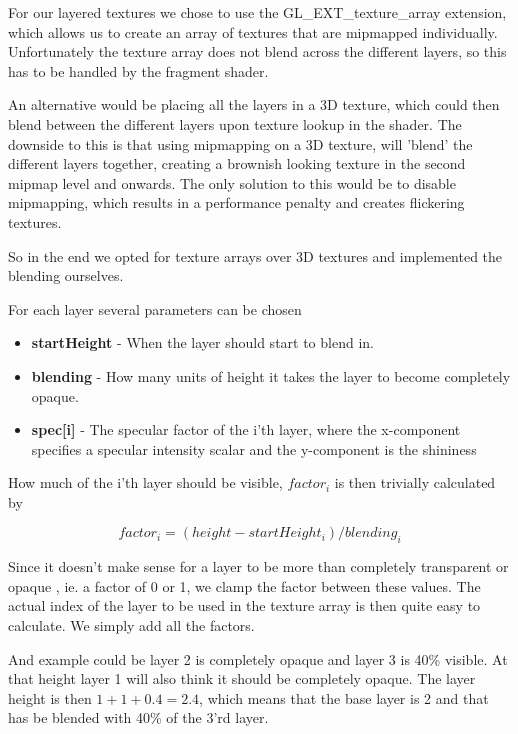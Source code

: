 For our layered textures we chose to use the GL\_EXT\_texture\_array
extension, which allows us to create an array of textures that are
mipmapped individually. Unfortunately the texture array does not blend
across the different layers, so this has to be handled by the fragment
shader.


An alternative would be placing all the layers in a 3D texture, which
could then blend between the different layers upon texture lookup in
the shader. The downside to this is that using mipmapping on a 3D
texture, will 'blend' the different layers together, creating a
brownish looking texture in the second mipmap level and onwards. The
only solution to this would be to disable mipmapping, which results in
a performance penalty and creates flickering textures.

So in the end we opted for texture arrays over 3D textures and
implemented the blending ourselves.

For each layer several parameters can be chosen

\newcommand{\layerProp}[2]{\item \textbf{#1} - #2}
\begin{itemize}
  \layerProp{startHeight}{When the layer should start to blend in.}
  \layerProp{blending}{How many units of height it takes the layer to
    become completely opaque.}
  \layerProp{spec[i]}{The specular factor of the i'th layer, where the
    x-component specifies a specular intensity scalar and the
    y-component is the shininess}
\end{itemize}

How much of the i'th layer should be visible, $factor_i$ is then
trivially calculated by

\begin{displaymath}
  factor_i = (height - startHeight_i) / blending_i
\end{displaymath}

Since it doesn't make sense for a layer to be more than completely
transparent or opaque , ie. a factor of 0 or 1, we clamp the factor
between these values. The actual index of the layer to be used in the
texture array is then quite easy to calculate. We simply add all the
factors. 

And example could be layer 2 is completely opaque and layer 3 is 40\%
visible. At that height layer 1 will also think it should be
completely opaque. The layer height is then $1 + 1 + 0.4 = 2.4$, which
means that the base layer is 2 and that has be blended with 40\% of
the 3'rd layer.

